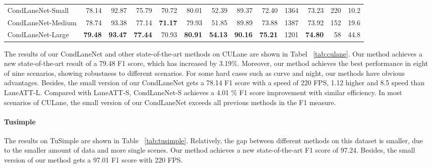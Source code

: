 \documentclass[10pt,twocolumn,letterpaper]{article}
\begin{document}
\begin{table*}[!b]
{\begin{tabular}{lrrrrrrrrrrrr}
\hline
CondLaneNet-Small & 78.14 & 92.87& 75.79 & 70.72 & 80.01 & 52.39 & 89.37 & 72.40 & 1364 & 73.23 & 220 & 10.2      \\
CondLaneNet-Medium & 78.74 & 93.38 & 77.14 &  \textbf{71.17} & 79.93 &  51.85 & 89.89 &  73.88 & 1387 & 73.92 & 152 & 19.6     \\
CondLaneNet-Large &  \textbf{79.48} &  \textbf{93.47} &  \textbf{77.44} & 70.93 &  \textbf{80.91} & \textbf{54.13} & \textbf{90.16} & \textbf{75.21} & 1201 &  \textbf{74.80} & 58 & 44.8      \\
\hline
\end{tabular}}
\caption{Comparison of different methods on CULane.}
\label{tab:culane}
\end{table*}
The results of our CondLaneNet and other state-of-the-art methods on CULane are shown in Tabel ~\ref{tab:culane}. Our method achieves a new state-of-the-art result of a 79.48 F1 score, which has increased by 3.19\%. Moreover, our method achieves the best performance in eight of nine scenarios, showing robustness to different scenarios. For some hard cases such as curve and night, our methods have obvious advantages. Besides, the small version of our CondLaneNet gets a 78.14 F1 score with a speed of 220 FPS, 1.12 higher and 8.5 speed than LaneATT-L. Compared with LaneATT-S, CondLaneNet-S achieves a 4.01 \% F1 score improvement with similar efficiency. In most scenarios of CULane, the small version of our CondLaneNet exceeds all previous methods in the F1 measure.

\paragraph{Tusimple}
The results on TuSimple are shown in Table ~\ref{tab:tusimple}. Relatively, the gap between different methods on this dataset is smaller, due to the smaller amount of data and more single scenes. Our method achieves a new state-of-the-art F1 score of 97.24. Besides, the small version of our method gets a 97.01 F1 score with 220 FPS.
\end{document}
